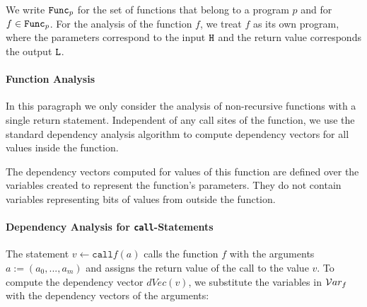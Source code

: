 We write $\mathtt{Func}_p$ for the set of functions that belong to a program $p$ and for $f \in \mathtt{Func}_p$. For the analysis of the function $f$, we treat $f$ as its own program, where the parameters correspond to the input $\mathtt{H}$ and the return value corresponds the output $\mathtt{L}$.

\paragraph{Function Analysis}
In this paragraph we only consider the analysis of non-recursive functions with a single return statement. Independent of any call sites of the function, we use the standard dependency analysis algorithm to compute dependency vectors for all values inside the function.

The dependency vectors computed for values of this function are defined over the variables created to represent the function's parameters. They do not contain variables representing bits of values from outside the function.




\paragraph{Dependency Analysis for \texttt{call}-Statements}
The statement $v \leftarrow \mathtt{call} f(a)$ calls the function $f$ with the arguments $a := (a_0,..., a_m)$ and assigns the return value of the call to the value $v$. To compute the dependency vector $dVec(v)$, we substitute the variables in $\mathcal{V}ar_f$ with the dependency vectors of the arguments:

